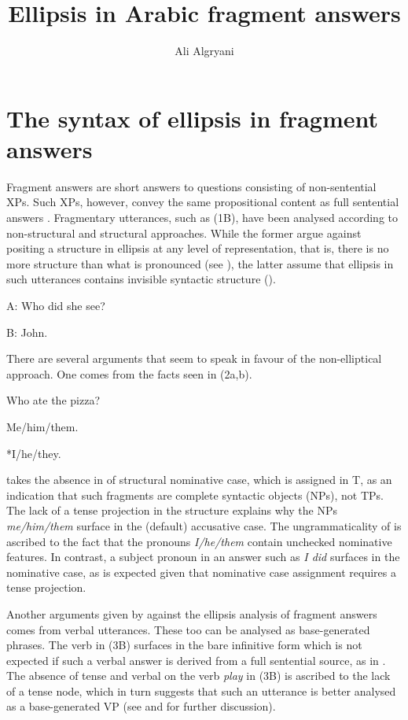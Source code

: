 \documentclass[output=paper]{LSP/langsci}
\author{Ali Algryani\affiliation{The Libyan Academy}}
\title{Ellipsis in Arabic fragment answers}
\begin{document}
\section{The syntax of ellipsis in fragment answers}\label{sec:algryani:1}


Fragment answers are short answers to questions consisting of non-sentential XPs. Such XPs, however, convey the same propositional content as full sentential answers
\citep{Merchant2004}. Fragmentary utterances, such as (1B), have been analysed according to non-structural and structural approaches. While the former argue against positing a structure in ellipsis at any level of representation, that is, there is no more structure than what is pronounced (see \citealt{Progovac2006,Casielles2006}), the latter assume that ellipsis in such utterances contains invisible syntactic structure (\citealt{Merchant2004,Merchant2006,Krifka2006,vanCraenenbroeck2010}).


\ea%
\label{ex:algryani:1}
	 A: Who did she see?


 B: John.
\z

There are several arguments that seem to speak in favour of the non-elliptical approach. One comes from the facts seen in (2a,b).


\ea%
 \label{ex:algryani:2}

	 Who ate the pizza?


\ea \label{ex:algryani:2a} Me/him/them.


\ex \label{ex:algryani:2b} *I/he/they.
\z
\z


\citet{Progovac2006} takes the absence in  of structural nominative case, which is assigned in T, as an indication that such fragments are complete syntactic objects (NPs), not TPs. The lack of a tense projection in the structure explains why the NPs \textit{me/him/them} surface in the (default) accusative case. The ungrammaticality of  is ascribed to the fact that the pronouns \textit{I/he/them} contain unchecked nominative  features. In contrast, a subject pronoun in an answer such as \textit{I did} surfaces in the nominative case, as is expected given that nominative case assignment requires a tense projection.


Another arguments given by \citet{Progovac2006} against the ellipsis analysis of fragment answers comes from verbal utterances. These too can be analysed as base-generated phrases. The verb in (3B) surfaces in the bare infinitive form which is not expected if such a verbal answer is derived from a full sentential source, as in . The absence of tense and verbal  on the verb \textit{play} in (3B) is ascribed to the lack of a tense node, which in turn suggests that such an utterance is better analysed as a base-generated VP (see \citealt{Progovac2006} and \citealt{Casielles2006} for further discussion).
\end{document}
